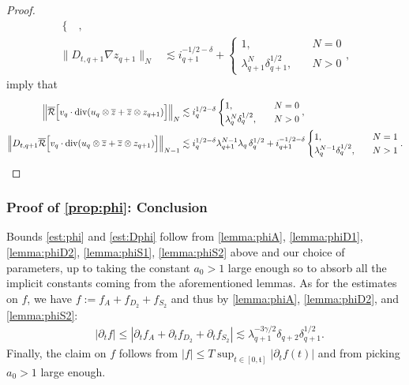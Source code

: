 \documentclass[10pt,a4paper]{amsart}
\numberwithin{equation}{section}
\numberwithin{corollario}{section}
\numberwithin{lemma}{section}
\numberwithin{prop}{section}
\theoremstyle{definition}
\theoremstyle{remark}
\newcommand{\dvg}{\mathord{{\rm div}}}
\newcommand{\varz}{\overline{z}}
\newcommand{\qq}{_{q+1}}
\newcommand{\qqq}{_{q+2}}
\begin{document}
\begin{proof}
\begin{align}
\begin{cases}
    \end{cases},
    \\
    \|D_{t,q+1}\nabla z\qq\|_N
    &\lesssim 
    i\qq^{-1/2-\delta}+\begin{cases}
        1,\quad &N=0\\
        \lambda\qq^N\delta\qq^{1/2},\quad &N>0
    \end{cases}, 
\end{align}
imply that
\begin{align}\label{est:phiS2fourth}
    \left\|\overline{\mathcal{R}}\Big[v_q\cdot \dvg(u_q\otimes \varz+\varz\otimes z\qq)\Big]\right\|_N
    &\lesssim 
    i_q^{1/2-\delta}\begin{cases}
        1,\quad &N=0\\
        \lambda_q^N\delta_q^{1/2},\quad &N>0
    \end{cases},
    \\
    \left\|D_{t,q+1}\overline{\mathcal{R}}\Big[v_q\cdot \dvg(u_q\otimes \varz+\varz\otimes z\qq)\Big]\right\|_{N-1}
    &\lesssim 
    i_q^{1/2-\delta}\lambda\qq^{N-1}\lambda_q\,\delta_q^{1/2}
    +
    i\qq^{-1/2-\delta}\begin{cases}
        1,\quad &N=1\\
        \lambda_q^{N-1}\delta_q^{1/2},\quad &N>1
    \end{cases}.
\end{align}
\end{proof}

\subsubsection{Proof of \autoref{prop:phi}: Conclusion}
 Bounds \eqref{est:phi} and \eqref{est:Dphi} follow from \autoref{lemma:phiA}, \autoref{lemma:phiD1},  \autoref{lemma:phiD2}, \autoref{lemma:phiS1}, \autoref{lemma:phiS2} above and our choice of parameters, up to taking the constant $a_0>1$ large enough so to absorb all the implicit constants coming from the aforementioned lemmas.
As for the estimates on $f$, we have $f := f_A+ f_{D_2}+f_{S_2}$ and thus by \autoref{lemma:phiA},  \autoref{lemma:phiD2}, and \autoref{lemma:phiS2}:
    \begin{align}
        &|\partial_t f|\le |\partial_t f_A+\partial_t f_{D_2}+\partial_t f_{S_2}|\lesssim\lambda\qq^{-3\gamma/2}\delta\qqq \delta\qq^{1/2}.
    \end{align}
    Finally, the claim on $f$ follows from $|f|\le T\sup_{t \in [0,\mathfrak{t}]}|\partial_t f(t)|$ and from picking $a_0>1$ large enough.
\end{document}
